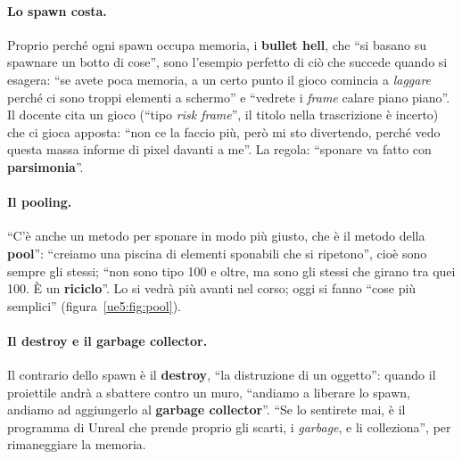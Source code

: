 \paragraph{Lo spawn costa.} Proprio perché ogni spawn occupa memoria, i \textbf{bullet
hell}, che ``si basano su spawnare un botto di cose'', sono l'esempio perfetto di ciò
che succede quando si esagera: ``se avete poca memoria, a un certo punto il gioco
comincia a \emph{laggare} perché ci sono troppi elementi a schermo'' e ``vedrete i
\emph{frame} calare piano piano''. Il docente cita un gioco (``tipo \emph{risk frame}'',
il titolo nella trascrizione è incerto) che ci gioca apposta: ``non ce la faccio più,
però mi sto divertendo, perché vedo questa massa informe di pixel davanti a me''. La
regola: ``sponare va fatto con \textbf{parsimonia}''.

\paragraph{Il pooling.} ``C'è anche un metodo per sponare in modo più giusto, che è il
metodo della \textbf{pool}'': ``creiamo una piscina di elementi sponabili che si
ripetono'', cioè sono sempre gli stessi; ``non sono tipo 100 e oltre, ma sono gli stessi
che girano tra quei 100. È un \textbf{riciclo}''. Lo si vedrà più avanti nel corso; oggi
si fanno ``cose più semplici'' (figura~\ref{ue5:fig:pool}).

\paragraph{Il destroy e il garbage collector.} Il contrario dello spawn è il
\textbf{destroy}, ``la distruzione di un oggetto'': quando il proiettile andrà a
sbattere contro un muro, ``andiamo a liberare lo spawn, andiamo ad aggiungerlo al
\textbf{garbage collector}''. ``Se lo sentirete mai, è il programma di Unreal che prende
proprio gli scarti, i \emph{garbage}, e li colleziona'', per rimaneggiare la memoria.

